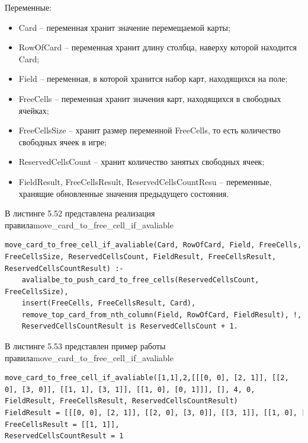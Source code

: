 \documentclass[12pt]{report}
\begin{document}
Переменные:
\begin{itemize}
\item Card – переменная хранит значение перемещаемой карты;
\item RowOfCard – переменная хранит длину столбца, наверху которой находится Card;
\item Field – переменная, в которой хранится набор карт, находящихся на поле;
\item FreeCells – переменная хранит значения карт, находящихся в свободных ячейках;
\item FreeCellsSize – хранит размер переменной FreeCells, то есть количество свободных ячеек в игре;
\item ReservedCellsCount – хранит количество занятых свободных ячеек;
\item FieldResult, FreeCellsResult, ReservedCellsCountResu – переменные, хранящие обновленные значения предыдущего состояния.
\end{itemize}

В листинге 5.52 представлена реализация правила\newline move\_card\_to\_free\_cell\_if\_avaliable

\begin{lstlisting}[label=some-code, caption=реализация правила move\_card\_to\_free\_cell\_if\_avaliable]
move_card_to_free_cell_if_avaliable(Card, RowOfCard, Field, FreeCells, FreeCellsSize, ReservedCellsCount, FieldResult, FreeCellsResult, ReservedCellsCountResult) :-
	avalialbe_to_push_card_to_free_cells(ReservedCellsCount, FreeCellsSize),
	insert(FreeCells, FreeCellsResult, Card),
	remove_top_card_from_nth_column(Field, RowOfCard, FieldResult), !,
	ReservedCellsCountResult is ReservedCellsCount + 1.
\end{lstlisting}

В листинге 5.53 представлен пример работы правила\newline move\_card\_to\_free\_cell\_if\_avaliable

\begin{lstlisting}[label=some-code, caption=пример работы правила move\_card\_to\_free\_cell\_if\_avaliable]
move_card_to_free_cell_if_avaliable([1,1],2,[[[0, 0], [2, 1]], [[2, 0], [3, 0]], [[1, 1], [3, 1]], [[1, 0], [0, 1]]], [], 4, 0, FieldResult, FreeCellsResult, ReservedCellsCountResult)
FieldResult = [[[0, 0], [2, 1]], [[2, 0], [3, 0]], [[3, 1]], [[1, 0], [0, 1]]], 
FreeCellsResult = [[1, 1]], 
ReservedCellsCountResult = 1
\end{lstlisting}
\end{document}
